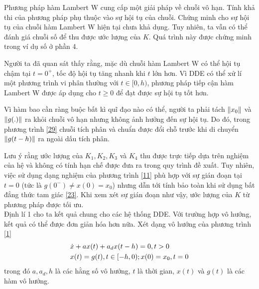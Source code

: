 \begin{nx}
	Phương pháp hàm Lambert W cung cấp một giải pháp về chuỗi vô hạn. Tính khả thi của phương pháp phụ thuộc vào sự hội tụ của chuỗi. Chứng minh cho sự hội tụ của chuỗi hàm Lambert W hiện tại chưa khả dụng. Tuy nhiên, ta vẫn có thể đánh giá chuỗi số để thu được ước lượng của $K$. Quá trình này được chứng minh trong ví dụ số ở phần 4. 
\end{nx}
\begin{nx}
	Người ta đã quan sát thấy rằng, mặc dù chuỗi hàm Lambert W có thể hội tụ chậm tại $t = 0^+$, tốc độ hội tụ tăng nhanh khi $t$ lớn hơn. Vì DDE có thể xử lí một phương trình vi phân thường với $t \in[0,h)$, phương pháp tiếp cận hàm Lambert W được áp dụng cho $t \ge 0$ để đạt được sự hội tụ tốt hơn. 
\end{nx}
\begin{nx}
	Vì hàm bao cần ràng buộc bất kì quĩ đạo nào có thể, người ta phải tách $\Vert x_0\Vert$ và $\Vert g(.)\Vert$ ra khỏi chuỗi vô hạn nhưng không ảnh hưởng đến sự hội tụ. Do đó, trong phương trình \eqref{29} chuỗi tích phân và chuẩn được đổi chỗ trước khi di chuyển $\Vert g(t-h)\Vert$ ra ngoài dấu tích phân.
\end{nx}
\begin{nx}
	Lưu ý rằng ước lượng của $K_1, K_2, K_3$ và $K_4$ thu được trực tiếp dựa trên nghiệm của hệ và không có tính hạn chế  được đưa ra trong quy trình đề xuất. Tuy nhiên, việc sử dụng dạng nghiệm của phương trình \eqref{11} phù hợp với sự gián đoạn tại $t = 0$ (tức là $g(0^-) \ne x(0) =x_0$)  nhưng dẫn tới tính bảo toàn khi sử dụng bất đẳng thức tam giác \eqref{23}.  Khi xem xét sự gián đoạn như vậy, ước lượng của $K$ từ phương pháp được tối ưu.\\
	Định lí 1 cho ta kết quả chung cho các hệ thống DDE. Với trường hợp vô hướng, kết quả có thể được đơn giản hóa hơn nữa. Xét dạng vô hướng của phương trình \eqref{1}
	\begin{align}\label{30}
		&\dot{x} + ax(t) +a_dx(t-h)=0, t > 0 \notag\\ 
		&x(t) = g(t), t \in [-h, 0); x(0) = x_0 , t = 0
	\end{align}
trong đó $a, a_d, h$ là các hằng số vô hướng, $t$ là thời gian, $x(t)$ và $g(t)$ là các hàm vô hướng.
\end{nx}
